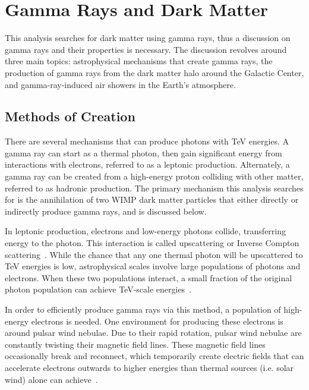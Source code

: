 \cleartooddpage[\thispagestyle{empty}]
\chapter{Gamma Rays and Dark Matter}\label{ch_gamma}


This analysis searches for dark matter using gamma rays, thus a discussion on gamma rays and their properties is necessary.
The discussion revolves around three main topics: astrophysical mechanisms that create gamma rays, the production of gamma rays from the dark matter halo around the Galactic Center, and gamma-ray-induced air showers in the Earth's atmosphere.

\section{Methods of Creation}

  There are several mechanisms that can produce photons with TeV energies.
  A gamma ray can start as a thermal photon, then gain significant energy from interactions with electrons, referred to as a leptonic production.
  Alternately, a gamma ray can be created from a high-energy proton colliding with other matter, referred to as hadronic production.
  The primary mechanism this analysis searches for is the annihilation of two WIMP dark matter particles that either directly or indirectly produce gamma rays, and is discussed below.

  In leptonic production, electrons and low-energy photons collide, transferring energy to the photon.
  This interaction is called upscattering or Inverse Compton scattering~\cite{compton_effect}.
  While the chance that any one thermal photon will be upscattered to TeV energies is low, astrophysical scales involve large populations of photons and electrons.
  When these two populations interact, a small fraction of the original photon population can achieve TeV-scale energies~\cite{gammas_from_electrons}.

  In order to efficiently produce gamma rays via this method, a population of high-energy electrons is needed.
  One environment for producing these electrons is around pulsar wind nebulae.
  Due to their rapid rotation, pulsar wind nebulae are constantly twisting their magnetic field lines.
  These magnetic field lines occasionally break and reconnect, which temporarily create electric fields that can accelerate electrons outwards to higher energies than thermal sources (i.e. solar wind) alone can achieve~\cite{gamma_pwn1,gamma_pwn2}.

